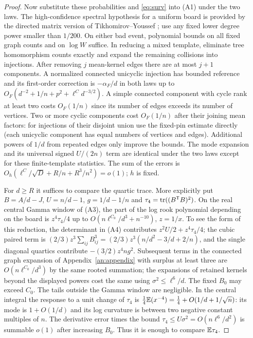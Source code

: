 \begin{proof}
Now substitute these probabilities and \eqref{eq:surv} into (A1) under the two laws. The high-confidence spectral hypothesis for a uniform board is provided by the directed matrix version of Tikhomirov--Youssef \cite[Theorem B]{TY}; use any fixed lower degree power smaller than $1/200$. On either bad event, polynomial bounds on all fixed graph counts and on $\log W$ suffice. In reducing a mixed template, eliminate tree homomorphism counts exactly and expand the remaining collisions into injections. After removing $j$ mean-kernel edges there are at most $j+1$ components. A normalized connected unicyclic injection has bounded reference and its first-order correction is $-\alpha_F/d$ in both laws up to
$O_F(d^{-2}+1/n+p^2+\ell^C d^{-3/2})$. A simple connected component with cycle rank at least two costs $O_F(1/n)$ since its number of edges exceeds its number of vertices. Two or more cyclic components cost $O_F(1/n)$ after their joining mean factors: for injections of their disjoint union use the fixed-pin estimate directly (each unicyclic component has equal numbers of vertices and edges). Additional powers of $1/d$ from repeated edges only improve the bounds. The mode expansion and its universal signed $U/(2n)$ term are identical under the two laws except for these finite-template statistics. The sum of the errors is
$O_h(\ell^C/\sqrt D+R/n+R^3/n^2)=o(1)$; $h$ is fixed.

For $d\ge R$ it suffices to compare the quartic trace. More explicitly put $B=A/d-J$, $U=n/d-1$, $g=1/d-1/n$ and $\tau_4=\operatorname{tr}((B^{\mathsf T}B)^2)$. On the real central Gamma window of (A3), the part of the log rook polynomial depending on the board is $z^4\tau_4/4$ up to $O(n\ell^{C_0}/d^3+n^{-10})$, $z=1/x$. To see the form of this reduction, the determinant in (A4) contributes $z^2 U/2+z^4\tau_4/4$; the cubic paired term is $(2/3)z^3\sum_{ij}B_{ij}^3=(2/3)z^3(n/d^2-3/d+2/n)$, and the single diagonal quartics contribute $-(3/2)z^4ng^2$. Subsequent terms in the connected graph expansion of Appendix~\ref{an:appendix} with surplus at least three are $O(n\ell^{C_0}/d^3)$ by the same rooted summation; the expansions of retained kernels beyond the displayed powers cost the same using $\sigma^2\le\ell^6/d$. The fixed $B_0$ may exceed $C_0$. The tails outside the Gamma window are negligible. In the central integral the response to a unit change of $\tau_4$ is $\frac14\mathbb E(x^{-4})=\frac14+O(1/d+1/\sqrt n)$: its mode is $1+O(1/d)$ and its log curvature is between two negative constant multiples of $n$. The derivative error times the bound $\tau_4\le U\sigma^2=O(n\ell^6/d^2)$ is summable $o(1)$ after increasing $B_0$. Thus it is enough to compare $\mathbb E\tau_4$.


\end{proof}
